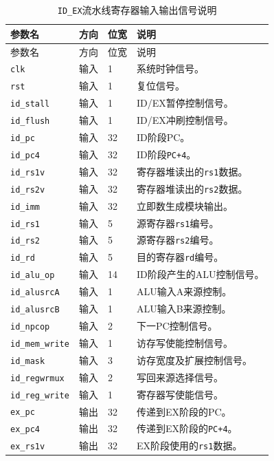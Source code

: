 \documentclass[UTF8,a4paper,12pt]{ctexart}
\newcommand{\code}[1]{\texttt{#1}}
\begin{document}
{\footnotesize
\renewcommand{\arraystretch}{1.12}
\begin{longtable}{p{3.2cm}p{1.5cm}p{2.1cm}p{7.0cm}}
\caption{\code{ID\_EX}流水线寄存器输入输出信号说明}\\
\toprule
参数名 & 方向 & 位宽 & 说明 \\
\midrule
\endfirsthead
\toprule
参数名 & 方向 & 位宽 & 说明 \\
\midrule
\endhead
\code{clk} & 输入 & 1 & 系统时钟信号。 \\
\code{rst} & 输入 & 1 & 复位信号。 \\
\code{id\_stall} & 输入 & 1 & ID/EX暂停控制信号。 \\
\code{id\_flush} & 输入 & 1 & ID/EX冲刷控制信号。 \\
\code{id\_pc} & 输入 & 32 & ID阶段PC。 \\
\code{id\_pc4} & 输入 & 32 & ID阶段\code{PC+4}。 \\
\code{id\_rs1v} & 输入 & 32 & 寄存器堆读出的\code{rs1}数据。 \\
\code{id\_rs2v} & 输入 & 32 & 寄存器堆读出的\code{rs2}数据。 \\
\code{id\_imm} & 输入 & 32 & 立即数生成模块输出。 \\
\code{id\_rs1} & 输入 & 5 & 源寄存器\code{rs1}编号。 \\
\code{id\_rs2} & 输入 & 5 & 源寄存器\code{rs2}编号。 \\
\code{id\_rd} & 输入 & 5 & 目的寄存器\code{rd}编号。 \\
\code{id\_alu\_op} & 输入 & 14 & ID阶段产生的ALU控制信号。 \\
\code{id\_alusrcA} & 输入 & 1 & ALU输入A来源控制。 \\
\code{id\_alusrcB} & 输入 & 1 & ALU输入B来源控制。 \\
\code{id\_npcop} & 输入 & 2 & 下一PC控制信号。 \\
\code{id\_mem\_write} & 输入 & 1 & 访存写使能控制信号。 \\
\code{id\_mask} & 输入 & 3 & 访存宽度及扩展控制信号。 \\
\code{id\_regwrmux} & 输入 & 2 & 写回来源选择信号。 \\
\code{id\_reg\_write} & 输入 & 1 & 寄存器写使能信号。 \\
\code{ex\_pc} & 输出 & 32 & 传递到EX阶段的PC。 \\
\code{ex\_pc4} & 输出 & 32 & 传递到EX阶段的\code{PC+4}。 \\
\code{ex\_rs1v} & 输出 & 32 & EX阶段使用的\code{rs1}数据。 \\

\end{longtable}}
\end{document}
